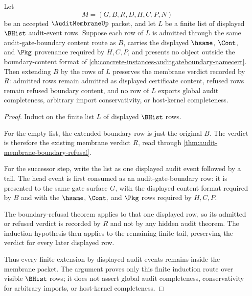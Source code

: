\begin{theorem}
\label{thm:auditmembrane-visible-audit-induction}
Let
$$
M=(G,B,R,D,H,C,P,N)
$$
be an accepted $\AuditMembraneUp$ packet, and let $L$ be a finite list of displayed $\BHist$ audit-event rows. Suppose each row of $L$ is admitted through the same audit-gate-boundary content route as $B$, carries the displayed $\hsame$, $\Cont$, and $\Pkg$ provenance required by $H,C,P$, and presents no object outside the boundary-content format of \autoref{ch:concrete-instances-auditgateboundary-namecert}. Then extending $B$ by the rows of $L$ preserves the membrane verdict recorded by $R$: admitted rows remain admitted as displayed certificate content, refused rows remain refused boundary content, and no row of $L$ exports global audit completeness, arbitrary import conservativity, or host-kernel completeness.
\end{theorem}
\begin{proof}
Induct on the finite list $L$ of displayed $\BHist$ rows.

For the empty list, the extended boundary row is just the original $B$. The verdict is therefore the existing membrane verdict $R$, read through \autoref{thm:audit-membrane-boundary-refusal}.

For the successor step, write the list as one displayed audit event followed by a tail. The head event is first consumed as an audit-gate-boundary row: it is presented to the same gate surface $G$, with the displayed content format required by $B$ and with the $\hsame$, $\Cont$, and $\Pkg$ rows required by $H,C,P$.

The boundary-refusal theorem applies to that one displayed row, so its admitted or refused verdict is recorded by $R$ and not by any hidden audit theorem. The induction hypothesis then applies to the remaining finite tail, preserving the verdict for every later displayed row.

Thus every finite extension by displayed audit events remains inside the membrane packet. The argument proves only this finite induction route over visible $\BHist$ rows; it does not assert global audit completeness, conservativity for arbitrary imports, or host-kernel completeness.
\end{proof}

